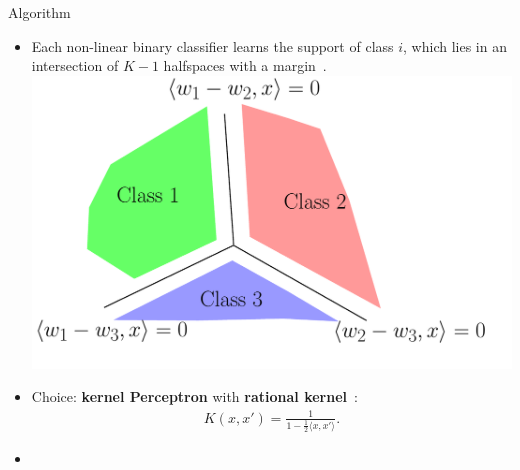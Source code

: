 \documentclass{beamer}
\begin{document}
\begin{frame}{Algorithm}
    \begin{itemize}
        \item<1-> Each non-linear binary classifier learns the support of class $i$, which lies in an intersection of $K-1$ halfspaces with a margin~\citep{Klivans-Servedio-2004}.\\
        \centering
        \includegraphics[width=0.6\linewidth]{figures/weak_sep.pdf}
        \item<2-> Choice: \textbf{kernel Perceptron} with \textbf{rational kernel}~\cite{Shalev-Shwartz-Shamir-Sridharan-2011}:
        \begin{align*}
            K(x, x') = \frac{1}{1-\frac{1}{2}\langle x, x'\rangle}.
        \end{align*}
        \item<3-> {\color{red}}


    \end{itemize}
\end{frame}



\end{document}
